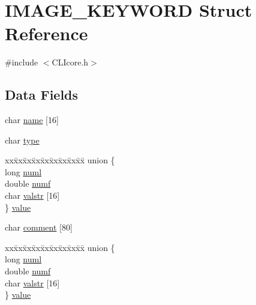 \hypertarget{structIMAGE__KEYWORD}{\section{I\+M\+A\+G\+E\+\_\+\+K\+E\+Y\+W\+O\+R\+D Struct Reference}
\label{structIMAGE__KEYWORD}
}


{\ttfamily \#include $<$C\+L\+Icore.\+h$>$}

\subsection*{Data Fields}
\begin{DoxyCompactItemize}
\item 
char \hyperlink{structIMAGE__KEYWORD_a46b348fc2781691d0f86267bb6a8c526}{name} \mbox{[}16\mbox{]}
\item 
char \hyperlink{structIMAGE__KEYWORD_a93acc5dd5d573d8e91129b27332e4ef4}{type}
\item 
\begin{tabbing}
xx\=xx\=xx\=xx\=xx\=xx\=xx\=xx\=xx\=\kill
union \{\\
\>long \hyperlink{structIMAGE__KEYWORD_a6b685359dddb142ca90215549108055d}{numl}\\
\>double \hyperlink{structIMAGE__KEYWORD_ac90e9ede78d5bc3173c2a0adc0a5b0c5}{numf}\\
\>char \hyperlink{structIMAGE__KEYWORD_a148ed6e2cddc70400b2692efbdd23280}{valstr} \mbox{[}16\mbox{]}\\
\} \hyperlink{structIMAGE__KEYWORD_a93da8b101ca9f8e620803c6e39316b0e}{value}\\

\end{tabbing}\item 
char \hyperlink{structIMAGE__KEYWORD_aaeae662480680535dc756ed39f201311}{comment} \mbox{[}80\mbox{]}
\item 
\begin{tabbing}
xx\=xx\=xx\=xx\=xx\=xx\=xx\=xx\=xx\=\kill
union \{\\
\>long \hyperlink{structIMAGE__KEYWORD_a6b685359dddb142ca90215549108055d}{numl}\\
\>double \hyperlink{structIMAGE__KEYWORD_ac90e9ede78d5bc3173c2a0adc0a5b0c5}{numf}\\
\>char \hyperlink{structIMAGE__KEYWORD_a148ed6e2cddc70400b2692efbdd23280}{valstr} \mbox{[}16\mbox{]}\\
\} \hyperlink{structIMAGE__KEYWORD_ae00a7165317bfd5266622cc3abae9b0f}{value}\\

\end{tabbing}\end{DoxyCompactItemize}


